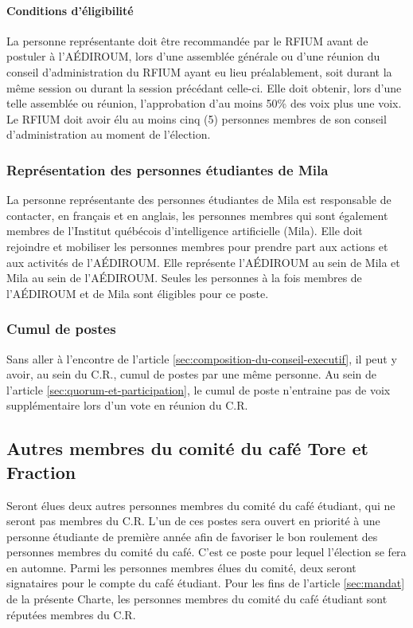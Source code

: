 \documentclass{aediroum}
\newcommand{\article}[1]{article \ref{#1}}
\begin{document}
\paragraph{Conditions d'éligibilité}

La personne représentante doit être recommandée par le
RFIUM avant de postuler à l’AÉDIROUM, lors d’une assemblée générale ou d’une réunion du conseil d’administration du RFIUM ayant eu lieu préalablement, soit durant la même session ou durant la session précédant celle-ci. Elle doit obtenir, lors d’une telle
assemblée ou réunion, l’approbation d’au moins 50\% des voix plus une voix. Le RFIUM doit avoir élu au moins cinq (5) personnes membres de son conseil d’administration au moment de l’élection.

\subsubsection{Représentation des personnes étudiantes de Mila}
La personne représentante des personnes étudiantes de Mila est responsable de contacter,
en français et en anglais, les personnes membres qui sont également membres de
l’Institut québécois d’intelligence artificielle (Mila). Elle doit rejoindre et mobiliser les
personnes membres pour prendre part aux actions et aux activités de l’AÉDIROUM. Elle
représente l’AÉDIROUM au sein de Mila et Mila au sein de l’AÉDIROUM. Seules les
personnes à la fois membres de l’AÉDIROUM et de Mila sont éligibles pour ce poste.

\subsubsection{Cumul de postes}\label{sec:cumul-de-postes}

Sans aller à l'encontre de l'\article{sec:composition-du-conseil-executif}, il peut y avoir, au sein du C.R., cumul de postes par une même personne. Au sein de l'\article{sec:quorum-et-participation}, le cumul de poste n'entraine pas de voix supplémentaire lors d'un vote en réunion du C.R.

\subsection{Autres membres du comité du café Tore et Fraction}\label{sec:autres-membres-du-comite-du-cafe-etudiant}

Seront élues deux autres personnes membres du comité du café étudiant, qui ne seront pas membres du C.R. L'un de ces postes sera ouvert en priorité à une personne étudiante de première année afin de favoriser le bon roulement des personnes membres du comité du café. C'est ce poste pour lequel l'élection se fera en automne. Parmi les personnes membres élues du comité, deux seront signataires pour le compte du café étudiant. Pour les fins de l'\article{sec:mandat} de la présente Charte, les personnes membres du comité du café étudiant sont réputées membres du C.R.
\end{document}
